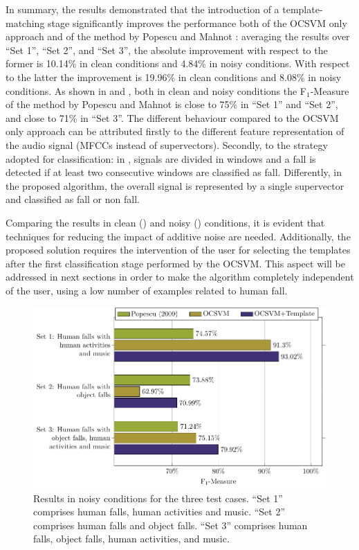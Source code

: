 In summary, the results demonstrated that the introduction of a template-matching stage significantly improves the performance both of the OCSVM only approach and of the method by Popescu and Mahnot \cite{Popescu2009}: averaging the results over ``Set 1'', ``Set 2'', and ``Set 3'', the absolute improvement with respect to the former is 10.14\% in clean conditions and 4.84\% in noisy conditions. With respect to the latter \cite{Popescu2009} the improvement is 19.96\% in clean conditions and 8.08\% in noisy conditions. As shown in  and , both in clean and noisy conditions the F$_1$-Measure of the method by Popescu and Mahnot \cite{Popescu2009} is close to 75\% in ``Set 1'' and ``Set 2'', and close to 71\% in ``Set 3''. The different behaviour compared to the OCSVM only approach can be attributed firstly to the different feature representation of the audio signal (MFCCs instead of supervectors). Secondly, to the strategy adopted for classification: in \cite{Popescu2009}, signals are divided in windows and a fall is detected if at least two consecutive windows are classified as fall. Differently, in the proposed algorithm, the overall signal is represented by a single supervector and classified as fall or non fall.

Comparing the results in clean () and noisy () conditions, it is evident that techniques for reducing the impact of additive noise are needed. Additionally, the proposed solution requires the intervention of the user for selecting the templates after the first classification stage performed by the OCSVM. This aspect will be addressed in next sections in order to make the algorithm completely independent of the user, using a low number of examples related to human fall.

\begin{figure}[ht]
	\centering
	\includegraphics[width=\columnwidth]{img/cin/res_noisy.pdf}
	\caption{Results in noisy conditions for the three test cases. ``Set 1'' comprises human falls, human activities and music. ``Set 2'' comprises human falls and object falls. ``Set 3'' comprises human falls, object falls, human activities, and music.} \label{fig:res_noisy_}
\end{figure}


